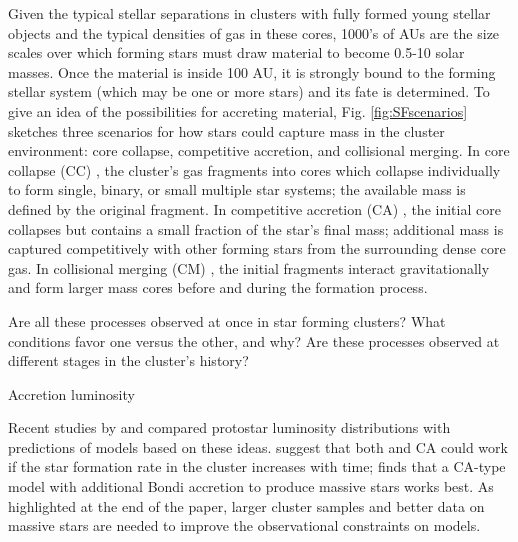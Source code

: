 Given the typical stellar separations in clusters with fully formed young stellar objects and the typical densities of gas in these cores, \num{1000}'s of AUs are the size scales over which forming stars must draw material to become 0.5-10 solar masses. Once the material is inside 100 AU, it is strongly bound to the forming stellar system (which may be one or more stars) and its fate is determined. To give an idea of the possibilities for accreting material, Fig. \ref{fig:SFscenarios} sketches three scenarios for how stars could capture mass in the cluster environment: core collapse, competitive accretion, and collisional merging. In core collapse (CC) \citep[Fig.~\ref{scenarios:a},][]{McKee:2003gxa, Myers:2011fy}, the cluster's gas fragments into cores which collapse individually to form single, binary, or small multiple star systems; the available mass is defined by the original fragment. In competitive accretion (CA) \citep[Fig.~\ref{scenarios:b},][]{Bonnell:1997vta}, the initial core collapses but contains a small fraction of the star's final mass; additional mass is captured competitively with other forming stars from the surrounding dense core gas. In collisional merging (CM) \citep[Fig.~\ref{scenarios:c},][]{Bonnell:2002et}, the initial fragments interact gravitationally and form larger mass cores before and during the formation process. 

Are all these processes observed at once in star forming clusters? What conditions favor one versus the other, and why? Are these processes observed at different stages in the cluster's history?

Accretion luminosity \citep{Offner:2011ex,}

Recent studies by \cite{Offner:2011p1357} and \cite{Myers:2011p1338} compared protostar luminosity distributions with predictions of  models based on these ideas. \cite{Offner:2011p1357} suggest that both  and CA could work if the star formation rate in the cluster increases with time; \cite{Myers:2011p1338} finds that a CA-type model with additional Bondi accretion to produce massive stars works best. As highlighted at the end of the \cite{Offner:2011p1357} paper, larger cluster samples and better data on massive stars are needed to improve the observational constraints on models.


